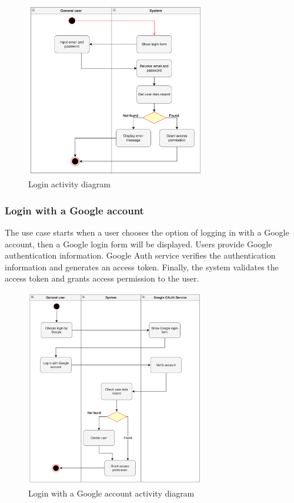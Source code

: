 \begin{figure}[H]
  \centering
  \includegraphics[width=0.7\textwidth]{Figures/login.png}
  \caption{Login activity diagram}
  \label{fig:login}
\end{figure}

\subsubsection{Login with a Google account}

The use case starts when a user chooses the option of logging in with a Google account, then a Google login form will be displayed. Users provide Google authentication information. Google Auth service verifies the authentication information and generates an access token. Finally, the system validates the access token and grants access permission to the user.

\begin{figure}[H]
  \centering
  \includegraphics[width=0.7\textwidth]{Figures/login_gg.png}
  \caption{Login with a Google account activity diagram}
  \label{fig:login-google}
\end{figure}

